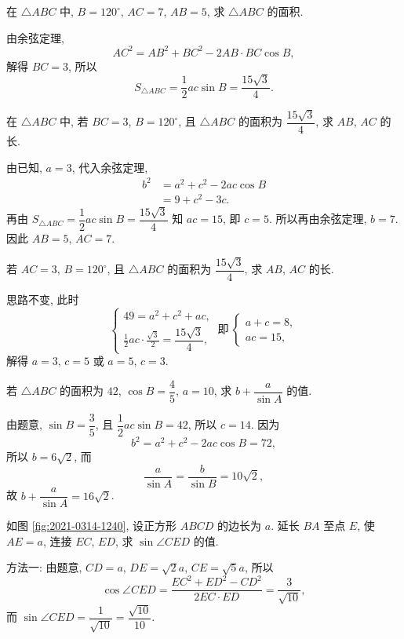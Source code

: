 \begin{exercise}
    在 $\triangle ABC$ 中, $B=120^\circ$, $AC=7$, $AB=5$, 求 $\triangle ABC$ 的面积.
\end{exercise}
\beginsolution
    由余弦定理, 
    \[AC^2= AB^2+ BC^2- 2AB\cdot BC\cos B,\]
    解得 $BC= 3$, 所以
    \[S_{\triangle ABC}= \frac12 ac\sin B= \dfrac{15\sqrt3}4.\]
\endsolution

\begin{exercise}
    在 $\triangle ABC$ 中, 若 $BC=3$, $B=120^\circ$, 且 $\triangle ABC$ 的面积为 $\dfrac{15\sqrt3}4$, 求 $AB$, $AC$ 的长.
\end{exercise}
\beginsolution
    由已知, $a=3$, 代入余弦定理,
    \[\begin{aligned}
        b^2&= a^2+c^2- 2ac\cos B\\
        &= 9+c^2- 3c.
    \end{aligned}\]
    再由 $S_{\triangle ABC}= \dfrac12 ac\sin B= \dfrac{15\sqrt3}4$ 知 $ac=15$, 即 $c=5$. 所以再由余弦定理, $b=7$. 因此 $AB=5$, $AC=7$.

    \varexercise 若 $AC=3$, $B=120^\circ$, 且 $\triangle ABC$ 的面积为 $\dfrac{15\sqrt3}4$, 求 $AB$, $AC$ 的长.

    思路不变, 此时
    \[\left\{\!\!\begin{array}{l}
        49= a^2+c^2+ac,\\
        \frac12 ac\cdot \frac{\sqrt3}{2}= \dfrac{15\sqrt3}4,
    \end{array}\right.\ \text{即}\ 
    \left\{\!\!\begin{array}{l}
        a+c= 8,\\
        ac=15,
    \end{array}\right.\]
    解得 $a=3$, $c=5$ 或 $a=5$, $c=3$.
\endsolution

\begin{exercise}
    若 $\triangle ABC$ 的面积为 $42$, $\cos B=\dfrac45$, $a=10$,  
    求 $b+\dfrac{a}{\sin A}$ 的值.
\end{exercise}
\beginsolution
    由题意, $\sin B= \dfrac35$, 
    且 $\dfrac12 ac\sin B= 42$, 所以 $c=14$. 因为
    \[b^2= a^2+c^2- 2ac\cos B= 72,\]
    所以 $b= 6\sqrt2$, 而
    \[\frac{a}{\sin A}= \frac{b}{\sin B}= 10\sqrt2,\]
    故 $b+\dfrac{a}{\sin A}= 16\sqrt2$.
\endsolution

\begin{exercise}
    如图 \ref{fig:2021-0314-1240}, 设正方形 $ABCD$ 的边长为 $a$. 延长 $BA$ 至点 $E$, 使 $AE=a$, 连接 $EC$, $ED$, 求 $\sin\angle CED$ 的值.
\end{exercise}
\beginsolution
    方法一: 由题意, 
    $CD=a$, $DE=\sqrt2 a$, $CE= \sqrt5 a$, 所以
    \[\cos\angle CED= \frac{EC^2+ED^2- CD^2}{2EC\cdot ED}
        = \frac3{\sqrt{10}},\]
    而 $\sin\angle CED= \dfrac1{\sqrt{10}}= \dfrac{\sqrt{10}}{10}$.

